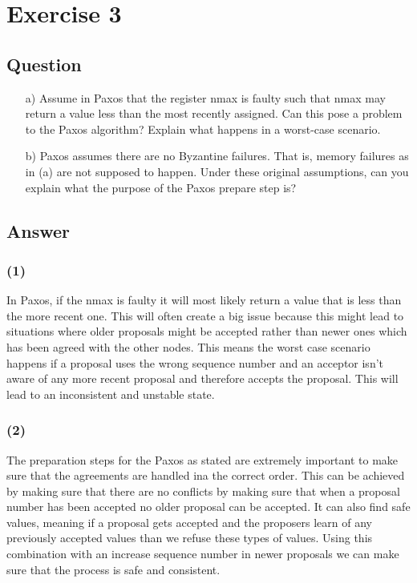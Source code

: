 \documentclass{article}
\begin{document}
\section*{Exercise 3}
\subsection*{Question}
\begin{enumerate}
    \item[a)] Assume in Paxos that the register nmax is faulty such that nmax may return a value less than the most recently assigned. Can this pose a problem to the Paxos algorithm? Explain what happens in a worst-case scenario.
    \item[b)] Paxos assumes there are no Byzantine failures. That is, memory failures as in (a) are not supposed to happen. Under these original assumptions, can you explain what the purpose of the Paxos prepare step is?
\end{enumerate}

\subsection*{Answer}
\subsubsection*{(1)}
In Paxos, if the nmax is faulty it will most likely return a value that is less than the more recent one. This will often create a big issue because this might lead to situations where older proposals might be accepted rather than newer ones which has been agreed with the other nodes. This means the worst case scenario happens if a proposal uses the wrong sequence number and an acceptor isn't aware of any more recent proposal and therefore accepts the proposal. This will lead to an inconsistent and unstable state.

\subsubsection*{(2)}
The preparation steps for the Paxos as stated are extremely important to make sure that the agreements are handled ina the correct order. This can be achieved by making sure that there are no conflicts by making sure that when a proposal number has been accepted no older proposal can be accepted. It can also find safe values, meaning if a proposal gets accepted and the proposers learn of any previously accepted values than we refuse these types of values. Using this combination with an increase sequence number in newer proposals we can make sure that the process is safe and consistent.


\newpage
\printbibliography
\end{document}
